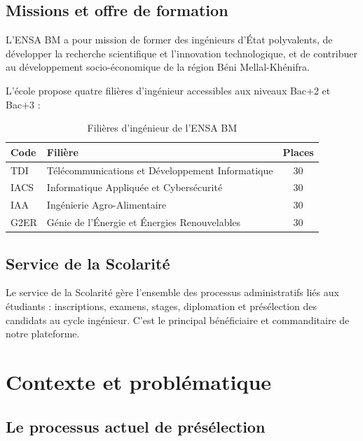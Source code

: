\subsection{Missions et offre de formation}
\label{missions-et-offre-de-formation}

L'ENSA BM a pour mission de former des ingénieurs d'État polyvalents, de développer la recherche scientifique et l'innovation technologique, et de contribuer au développement socio-économique de la région Béni Mellal-Khénifra.

L'école propose quatre filières d'ingénieur accessibles aux niveaux Bac+2 et Bac+3 :

\begin{table}[htbp]
  \centering
  \caption{Filières d'ingénieur de l'ENSA BM}
  \begin{tabularx}{\textwidth}{@{} l X c @{}}
    \toprule
    \textbf{Code} & \textbf{Filière} & \textbf{Places} \\
    \midrule
    TDI & Télécommunications et Développement Informatique & 30 \\
    IACS & Informatique Appliquée et Cybersécurité & 30 \\
    IAA & Ingénierie Agro-Alimentaire & 30 \\
    G2ER & Génie de l'Énergie et Énergies Renouvelables & 30 \\
    \bottomrule
  \end{tabularx}
  \label{tab:filieres}
\end{table}

\subsection{Service de la Scolarité}
\label{service-de-la-scolarite}

Le service de la Scolarité gère l'ensemble des processus administratifs liés aux étudiants : inscriptions, examens, stages, diplomation et présélection des candidats au cycle ingénieur. C'est le principal bénéficiaire et commanditaire de notre plateforme.

\section{Contexte et problématique}
\label{contexte-et-problematique}

\subsection{Le processus actuel de présélection}
\label{le-processus-actuel-de-preselection}

